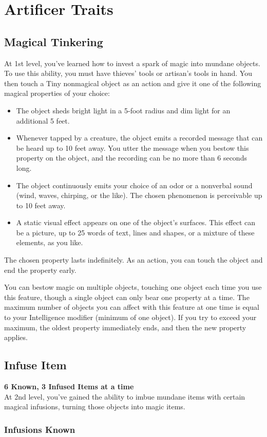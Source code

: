 \documentclass[letterpaper,openany,oneside,twocolumn]{book}
\begin{document}
\section*{Artificer Traits}
\subsection*{Magical Tinkering}
At 1st level, you've learned how to invest a spark of magic into mundane objects. To use this ability, you must have thieves' tools or artisan's tools in hand. You then touch a Tiny nonmagical object as an action and give it one of the following magical properties of your choice:
\begin{itemize}
	\item The object sheds bright light in a 5-foot radius and dim light for an additional 5 feet.
	\item Whenever tapped by a creature, the object emits a recorded message that can be heard up to 10 feet away. You utter the message when you bestow this property on the object, and the recording can be no more than 6 seconds long.
	\item The object continuously emits your choice of an odor or a nonverbal sound (wind, waves, chirping, or the like). The chosen phenomenon is perceivable up to 10 feet away.
	\item A static visual effect appears on one of the object's surfaces. This effect can be a picture, up to 25 words of text, lines and shapes, or a mixture of these elements, as you like.
\end{itemize}
The chosen property lasts indefinitely. As an action, you can touch the object and end the property early.

You can bestow magic on multiple objects, touching one object each time you use this feature, though a single object can only bear one property at a time. The maximum number of objects you can affect with this feature at one time is equal to your Intelligence modifier (minimum of one object). If you try to exceed your maximum, the oldest property immediately ends, and then the new property applies.
\subsection*{Infuse Item}
\textbf{6 Known, 3 Infused Items at a time}\\
At 2nd level, you've gained the ability to imbue mundane items with certain magical infusions, turning those objects into magic items.
\subsubsection*{Infusions Known}
\end{document}
